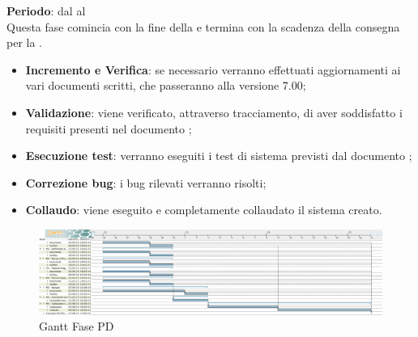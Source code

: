 	\textbf{Periodo}: dal  al  \\Questa fase comincia con la fine della  e termina con la scadenza della consegna per la .
	\begin{itemize}
		\item \textbf{Incremento e Verifica}: se necessario verranno effettuati aggiornamenti ai vari documenti scritti, che passeranno alla versione 7.00;
		\item \textbf{Validazione}: viene verificato, attraverso tracciamento, di aver soddisfatto i requisiti presenti nel documento ;
		\item \textbf{Esecuzione test}: verranno eseguiti i test di sistema previsti dal documento ;
		\item \textbf{Correzione bug}: i bug rilevati verranno risolti;
		\item \textbf{Collaudo}: viene eseguito e completamente collaudato il sistema creato.
	\end{itemize}
		\begin{figure}[H]\centering
			\includegraphics[width=\textwidth]{PianoDiProgetto/Pics/FasePD.png}
		\caption{Gantt Fase PD}
\end{figure}
